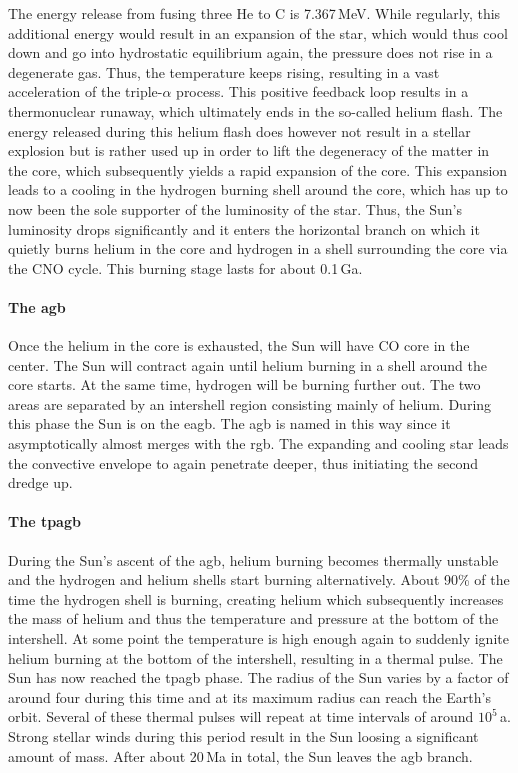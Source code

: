 The energy release from fusing three He to C is 7.367\,MeV. While regularly, this additional energy would result in an expansion of the star, which would thus cool down and go into hydrostatic equilibrium again, the pressure does not rise in a degenerate gas. Thus, the temperature keeps rising, resulting in a vast acceleration of the triple-$\alpha$ process. This positive feedback loop results in a thermonuclear runaway, which ultimately ends in the so-called helium flash. The energy released during this helium flash does however not result in a stellar explosion but is rather used up in order to lift the degeneracy of the matter in the core, which subsequently yields a rapid expansion of the core. This expansion leads to a cooling in the hydrogen burning shell around the core, which has up to now been the sole supporter of the luminosity of the star. Thus, the Sun's luminosity drops significantly and it enters the horizontal branch on which it quietly burns helium in the core and hydrogen in a shell surrounding the core via the CNO cycle. This burning stage lasts for about 0.1\,Ga.

\paragraph{The \acl{agb}}
Once the helium in the core is exhausted, the Sun will have CO core in the center. The Sun will contract again until helium burning in a shell around the core starts. At the same time, hydrogen will be burning further out. The two areas are separated by an intershell region consisting mainly of helium. During this phase the Sun is on the \ac{eagb}. The \ac{agb} is named in this way since it asymptotically almost merges with the \ac{rgb}. The expanding and cooling star leads the convective envelope to again penetrate deeper, thus initiating the second dredge up. 

\paragraph{The \acl{tpagb}}
During the Sun's ascent of the \ac{agb}, helium burning becomes thermally unstable and the hydrogen and helium shells start burning alternatively. 
About 90\% of the time the hydrogen shell is burning, creating helium which subsequently increases the mass of helium and thus the temperature and pressure at the bottom of the intershell. At some point the temperature is high enough again to suddenly ignite helium burning at the bottom of the intershell, resulting in a thermal pulse. The Sun has now reached the \ac{tpagb} phase. 
The radius of the Sun varies by a factor of around four during this time and at its maximum radius can reach the Earth's orbit. Several of these thermal pulses will repeat at time intervals of around $10^5$\,a. Strong stellar winds during this period result in the Sun loosing a significant amount of mass. After about 20\,Ma in total, the Sun leaves the \ac{agb} branch.

